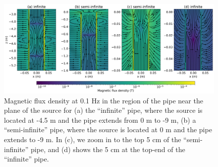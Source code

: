 \begin{figure}
    \begin{center}
    \includegraphics[width=\columnwidth]{figures/casing_software/AugustinBfields.png}
    \end{center}
\caption{
    Magnetic flux density at 0.1 Hz in the region of the pipe near the plane of the source for
    (a) the ``infinite'' pipe, where the source is located at -4.5 m and the pipe extends from 0 m to -9 m,
    (b) a ``semi-infinite'' pipe, where the source is located at 0 m and the pipe extends to -9 m.
    In (c), we zoom in to the top 5 cm of the ``semi-infinite'' pipe,
    and (d) shows the 5 cm at the top-end of the ``infinite'' pipe.
}
\label{fig:AugustinBfields}
\end{figure}
